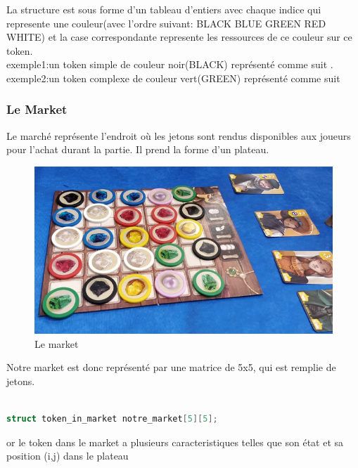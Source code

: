 \documentclass{article}
\begin{document}
La structure est sous forme d'un tableau d'entiers avec chaque indice qui represente une couleur(avec l'ordre suivant: BLACK BLUE GREEN RED WHITE) et la case correspondante represente les ressources de ce couleur sur ce token.\\ 

\vspace{1em}exemple1:un token simple de couleur noir(BLACK) représenté comme suit .\\
 
\vspace{1em}
exemple2:un token complexe de couleur vert(GREEN) représenté comme suit 

\subsubsection{Le Market}
 Le marché représente l'endroit où les jetons sont rendus disponibles aux joueurs pour l'achat durant la partie. Il prend la forme d'un plateau.
\begin{figure}[ht]
    \centering
    \includegraphics[width=0.4\linewidth]{plateau.png}
    \caption{Le market}
    \label{fig:PLATEAU}
\end{figure}

Notre market est donc  représenté par une matrice de 5x5, qui est remplie de jetons.
\begin{tcolorbox}[colback=white!5,colframe=white!75!black]

\begin{lstlisting}[language=C, caption={le plateau}, label={lst:exemple6-c}]

struct token_in_market notre_market[5][5];
\end{lstlisting}
\end{tcolorbox}
or le token dans le market a plusieurs caracteristiques telles que son état et sa position (i,j) dans le plateau 
\end{document}
